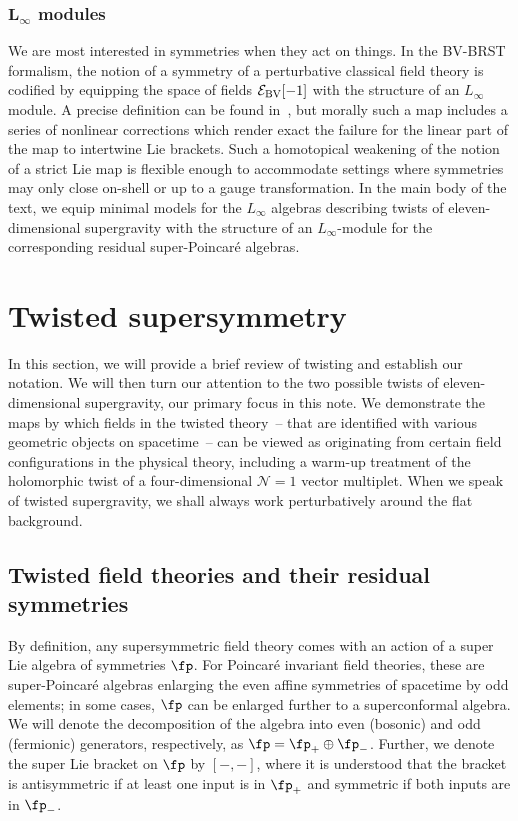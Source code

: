 \documentclass[pdftex]{sigma}
\numberwithin{equation}{section}
\theoremstyle{definition}
\begin{document}
\subsubsection[L\_infty modules]{$\boldsymbol{ L_\infty}$ modules}
 We are most interested in symmetries when they act on things. In the BV-BRST formalism, the notion of a symmetry of a perturbative classical field theory is codified by equipping the space of fields $\mathcal{E}_{\rm BV}[-1]$ with the structure of an $L_\infty$ module. A precise definition can be found in~\cite{LadaMarkl}, but morally such a map includes a series of nonlinear corrections which render exact the failure for the linear part of the map to intertwine Lie brackets. Such a homotopical weakening of the notion of a strict Lie map is flexible enough to accommodate settings where symmetries may only close on-shell or up to a gauge transformation. In the main body of the text, we equip minimal models for the $L_\infty$ algebras describing twists of eleven-dimensional supergravity with the structure of an $L_\infty$-module for the corresponding residual super-Poincar\'e algebras.

\section{Twisted supersymmetry} \label{sec: twisted-susy}
In this section, we will provide a brief review of twisting and establish our notation. We will then turn our attention to the two possible twists of eleven-dimensional supergravity, our primary focus in this note. We demonstrate the maps by which fields in the twisted theory~-- that are identified with various geometric objects on spacetime~-- can be viewed as originating from certain field configurations in the physical theory, including a warm-up treatment of the holomorphic twist of a four-dimensional $\mathcal{N}=1$ vector multiplet. When we speak of twisted supergravity, we shall always work perturbatively around the flat background.

\subsection{Twisted field theories and their residual symmetries}
By definition, any supersymmetric field theory comes with an action of a super Lie algebra of symmetries $\fp$. For Poincar\'e invariant field theories, these are super-Poincar\'e algebras enlarging the even affine symmetries of spacetime by odd elements; in some cases, $\fp$ can be enlarged further to a superconformal algebra. We will denote the decomposition of the algebra into even (bosonic) and odd (fermionic) generators, respectively, as
$
 \fp = \fp_+ \oplus \fp_-$.
Further, we denote the super Lie bracket on $\fp$ by $[-,-]$, where it is understood that the bracket is antisymmetric if at least one input is in $\fp_+$ and symmetric if both inputs are in $\fp_-$.
\end{document}
